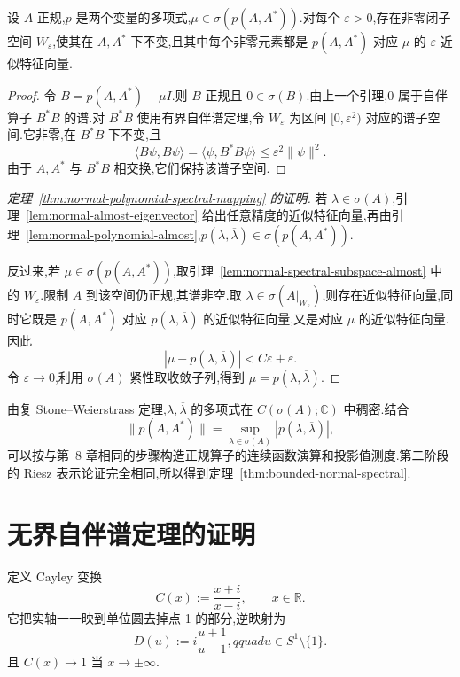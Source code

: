 \begin{lemma}[正规算子的谱子空间近似]\label{lem:normal-spectral-subspace-almost}
设 \(A\) 正规,\(p\) 是两个变量的多项式,\(\mu\in\sigma(p(A,A^{*}))\).对每个 \(\varepsilon>0\),存在非零闭子空间 \(W_{\varepsilon}\),使其在 \(A,A^{*}\) 下不变,且其中每个非零元素都是 \(p(A,A^{*})\) 对应 \(\mu\) 的 \(\varepsilon\)-近似特征向量.
\end{lemma}

\begin{proof}
令 \(B=p(A,A^{*})-\mu I\).则 \(B\) 正规且 \(0\in\sigma(B)\).由上一个引理,0 属于自伴算子 \(B^{*}B\) 的谱.对 \(B^{*}B\) 使用有界自伴谱定理,令 \(W_{\varepsilon}\) 为区间 \([0,\varepsilon^{2})\) 对应的谱子空间.它非零,在 \(B^{*}B\) 下不变,且
\[
\langle B\psi,B\psi\rangle
=\langle\psi,B^{*}B\psi\rangle\leq\varepsilon^{2}\|\psi\|^{2}.
\]
由于 \(A,A^{*}\) 与 \(B^{*}B\) 相交换,它们保持该谱子空间.
\end{proof}

\begin{proof}[定理~\ref{thm:normal-polynomial-spectral-mapping} 的证明]
若 \(\lambda\in\sigma(A)\),引理~\ref{lem:normal-almost-eigenvector} 给出任意精度的近似特征向量,再由引理~\ref{lem:normal-polynomial-almost},\(p(\lambda,\overline\lambda)\in\sigma(p(A,A^{*}))\).

反过来,若 \(\mu\in\sigma(p(A,A^{*}))\),取引理~\ref{lem:normal-spectral-subspace-almost} 中的 \(W_{\varepsilon}\).限制 \(A\) 到该空间仍正规,其谱非空.取 \(\lambda\in\sigma(A|_{W_{\varepsilon}})\),则存在近似特征向量,同时它既是 \(p(A,A^{*})\) 对应 \(p(\lambda,\overline\lambda)\) 的近似特征向量,又是对应 \(\mu\) 的近似特征向量.因此
\[
|\mu-p(\lambda,\overline\lambda)|<C\varepsilon+\varepsilon.
\]
令 \(\varepsilon\to0\),利用 \(\sigma(A)\) 紧性取收敛子列,得到 \(\mu=p(\lambda,\overline\lambda)\).
\end{proof}

由复 Stone--Weierstrass 定理,\(\lambda,\overline\lambda\) 的多项式在 \(C(\sigma(A);\mathbb{C})\) 中稠密.结合
\[
\|p(A,A^{*})\|=\sup_{\lambda\in\sigma(A)}|p(\lambda,\overline\lambda)|,
\]
可以按与第~8 章相同的步骤构造正规算子的连续函数演算和投影值测度.第二阶段的 Riesz 表示论证完全相同,所以得到定理~\ref{thm:bounded-normal-spectral}.

\section{无界自伴谱定理的证明}
\label{sec:proof-unbounded-spectral}

定义 Cayley 变换
\[
C(x):=\frac{x+i}{x-i},\qquad x\in\mathbb{R}.
\label{eq:cayley-map}
\]
它把实轴一一映到单位圆去掉点 1 的部分,逆映射为
\[
D(u):=i\frac{u+1}{u-1},qquad u\in S^{1}\setminus\{1\}.
\label{eq:cayley-inverse}
\]
且 \(C(x)\to1\) 当 \(x\to\pm\infty\).

